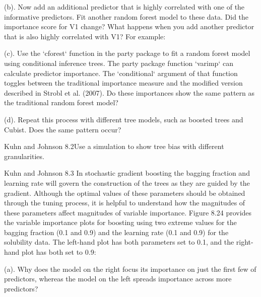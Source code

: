\documentclass[]{report}
\begin{document}
\begin{subquestion}{(b).} Now add an additional predictor that is highly correlated with one of the informative predictors. Fit another random forest model to these data. Did the importance score for V1 change? What happens when you add another predictor that is also highly correlated with V1? For example:\end{subquestion}

\begin{subquestion}{(c).} Use the `cforest` function in the party package to fit a random forest model using conditional inference trees. The party package function `varimp` can calculate predictor importance. The `conditional` argument of that function toggles between the traditional importance measure and the modified version described in Strobl et al. (2007). Do these importances show the same pattern as the traditional random forest model?\end{subquestion}

\begin{subquestion}{(d).} Repeat this process with different tree models, such as boosted trees and Cubist. Does the same pattern occur?\end{subquestion}


\begin{question}{Kuhn and Johnson 8.2}Use a simulation to show tree bias with different granularities.\end{question}


\begin{question}{Kuhn and Johnson 8.3} In stochastic gradient boosting the bagging fraction and learning rate will govern the construction of the trees as they are guided by the gradient. Although the optimal values of these parameters should be obtained through the tuning process, it is helpful to understand how the magnitudes of these parameters affect magnitudes of variable importance. Figure 8.24 provides the variable importance plots for boosting using two extreme values for the bagging fraction (0.1 and 0.9) and the learning rate (0.1 and 0.9) for the solubility data. The left-hand plot has both parameters set to 0.1, and the right-hand plot has both set to 0.9: \end{question}

\begin{subquestion}{(a).} Why does the model on the right focus its importance on just the first few of predictors, whereas the model on the left spreads importance across more predictors? \end{subquestion}
\end{document}
